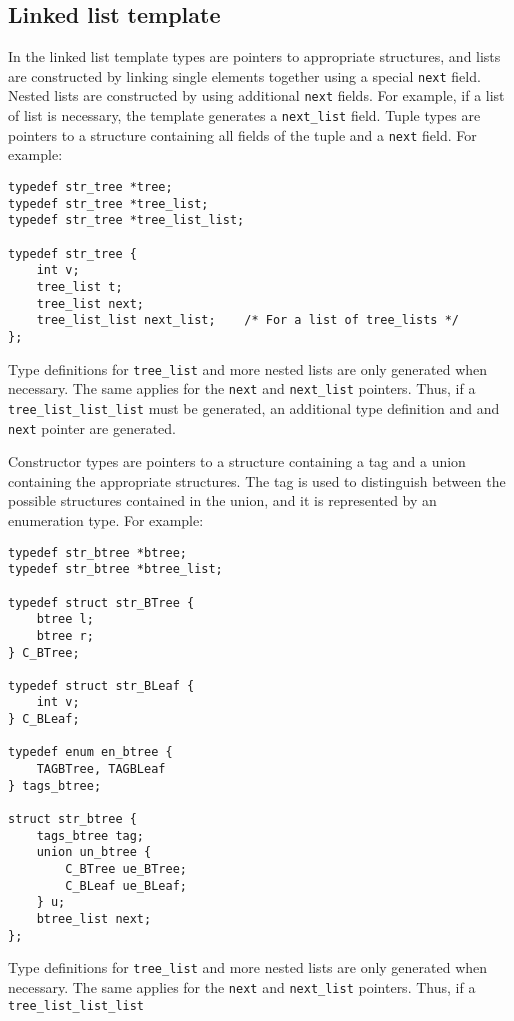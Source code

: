 \subsection{Linked list template}
In the linked list template {\Tm} types are pointers
to appropriate structures,
and lists are constructed by linking single elements together using
a special {\tt next} field.
Nested lists are constructed by using additional \verb+next+ fields.
For example, if a list of list is necessary, the template generates
a \verb+next_list+ field.
Tuple types are pointers to a structure containing all
fields of the tuple and a {\tt next} field.
For example:
\begin{verbatim}
typedef str_tree *tree;
typedef str_tree *tree_list;
typedef str_tree *tree_list_list;

typedef str_tree {
    int v;
    tree_list t;
    tree_list next;
    tree_list_list next_list;    /* For a list of tree_lists */
};
\end{verbatim}
Type definitions for \verb+tree_list+ and more nested lists
are only generated when necessary. The same applies for the
\verb+next+ and \verb+next_list+ pointers. Thus, if a \verb+tree_list_list_list+
must be generated, an additional type definition and and \verb+next+ pointer
are generated.
\par
Constructor types are pointers to a structure containing
a tag and a union containing the appropriate structures.
The tag is used to distinguish between the possible structures
contained in the union, and it is represented by an enumeration type.
For example:
\begin{verbatim}
typedef str_btree *btree;
typedef str_btree *btree_list;

typedef struct str_BTree {
    btree l;
    btree r;
} C_BTree;

typedef struct str_BLeaf {
    int v;
} C_BLeaf;

typedef enum en_btree {
    TAGBTree, TAGBLeaf
} tags_btree;

struct str_btree {
    tags_btree tag;
    union un_btree {
        C_BTree ue_BTree;
        C_BLeaf ue_BLeaf;
    } u;
    btree_list next;
};
\end{verbatim}
Type definitions for \verb+tree_list+ and more nested lists
are only generated when necessary. The same applies for the
\verb+next+ and \verb+next_list+ pointers. Thus, if a \verb+tree_list_list_list+
